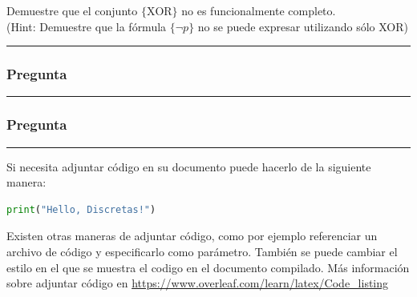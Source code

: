 \documentclass[12pt]{article}
\begin{document}
Demuestre que el conjunto $\{\text{XOR}\}$ no es funcionalmente completo.
\\ (Hint: Demuestre que la fórmula $\{\neg p \}$ no se puede expresar utilizando sólo XOR)
\\ \rule{\linewidth}{0.4pt}








\newpage

\subsubsection*{Pregunta }
\rule{\linewidth}{0.4pt} %


\subsubsection*{Pregunta }
\rule{\linewidth}{0.4pt} %



Si necesita adjuntar código en su documento puede hacerlo de la siguiente manera:

\begin{lstlisting}[language=Python]
print("Hello, Discretas!")
\end{lstlisting}

Existen otras maneras de adjuntar código, como por ejemplo referenciar un archivo de código y especificarlo como parámetro. También se puede cambiar el estilo en el que se muestra el codigo en el documento compilado. Más información sobre adjuntar código en \href{https://www.overleaf.com/learn/latex/Code_listing}{https://www.overleaf.com/learn/latex/Code\_listing}







\end{document}
